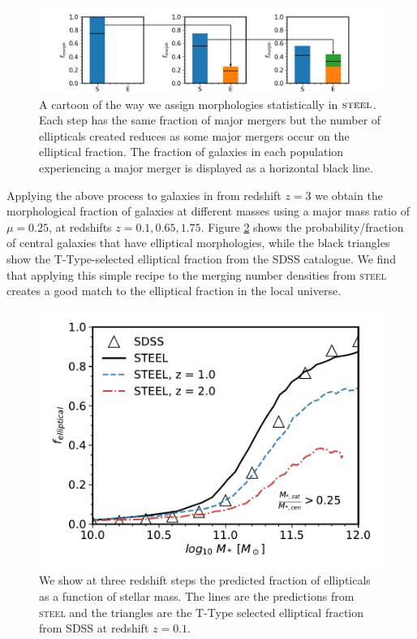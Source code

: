 \begin{figure}[h]
	\centering
	\includegraphics[width = \linewidth]{Figures/Chapter5/Morphology_Evolution.png}
	\caption{A cartoon of the way we assign morphologies statistically in $\textsc{steel}$. Each step has the same fraction of major mergers but the number of ellipticals created reduces as some major mergers occur on the elliptical fraction. The fraction of galaxies in each population experiencing a major merger is displayed as a horizontal black line.}
	\label{fig:Gal_Morph_toon}
\end{figure}

Applying the above process to galaxies in \steel from redshift $z = 3$ we obtain the morphological fraction of galaxies at different masses using a major mass ratio of $\mu = 0.25$, at redshifts $z = 0.1, 0.65, 1.75$. Figure \ref{fig:Gal_Morph} shows the probability/fraction of central galaxies that have elliptical morphologies, while the black triangles show the T-Type-selected elliptical fraction from the SDSS catalogue. We find that applying this simple recipe to the merging number densities from \textsc{steel} creates a good match to the elliptical fraction in the local universe.

\begin{figure}[h]
	\centering
	\includegraphics[width = \linewidth]{Figures/Chapter5/GalaxyMorphologies.pdf}
	\caption{We show at three redshift steps the predicted fraction of ellipticals as a function of stellar mass. The lines are the predictions from \textsc{steel} and the triangles are the T-Type selected elliptical fraction from SDSS at redshift $z = 0.1$.}
	\label{fig:Gal_Morph}
\end{figure}


